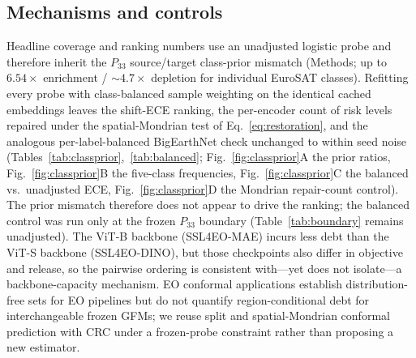 \documentclass[preprint,11pt,authoryear]{elsarticle}
\begin{document}
\subsection{Mechanisms and controls}
Headline coverage and ranking numbers use an unadjusted logistic probe and therefore inherit the
$P_{33}$ source/target class-prior mismatch (Methods; up to $6.54\times$ enrichment / $\sim\!4.7\times$
depletion for individual EuroSAT classes). Refitting every probe with class-balanced sample weighting on
the identical cached embeddings leaves the shift-ECE ranking, the per-encoder count of risk levels
repaired under the spatial-Mondrian test of Eq.~\eqref{eq:restoration}, and the analogous
per-label-balanced BigEarthNet check unchanged to within seed noise
(Tables~\ref{tab:classprior},~\ref{tab:balanced}; Fig.~\ref{fig:classprior}A the prior ratios, Fig.~\ref{fig:classprior}B the five-class frequencies, Fig.~\ref{fig:classprior}C the balanced vs.\ unadjusted ECE, Fig.~\ref{fig:classprior}D the Mondrian repair-count control). The prior mismatch
therefore does not appear to drive the ranking; the balanced control was run only at the frozen
$P_{33}$ boundary (Table~\ref{tab:boundary} remains unadjusted). The ViT-B backbone (SSL4EO-MAE)
incurs less debt than the ViT-S backbone (SSL4EO-DINO), but those checkpoints also differ in objective
and release, so the pairwise ordering is consistent with---yet does not isolate---a backbone-capacity
mechanism. EO conformal applications establish distribution-free sets for EO pipelines
\citep{singh2024uncertainty,lou2024geoconformal,mao2024spatial} but do not quantify region-conditional
debt for interchangeable frozen GFMs; we reuse split and spatial-Mondrian conformal prediction with
CRC \citep{vovk2005algorithmic,vovk2003mondrian,angelopoulos2024crc} under a frozen-probe constraint
rather than proposing a new estimator.
\end{document}
